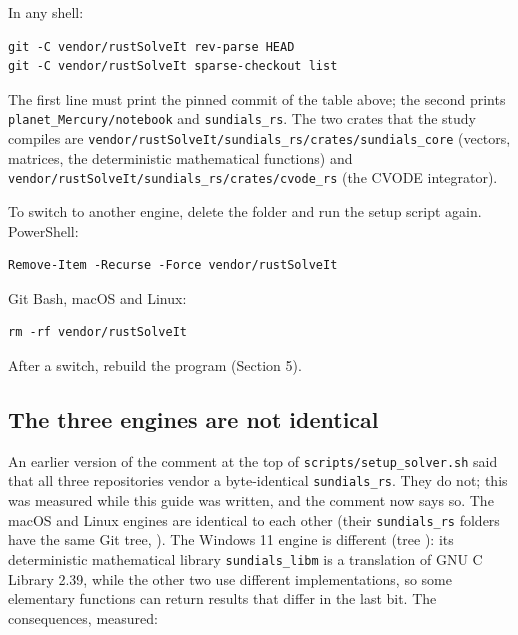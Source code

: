 \documentclass[11pt]{article}
\begin{document}
In any shell:

\begin{Verbatim}[fontsize=\small]
git -C vendor/rustSolveIt rev-parse HEAD
git -C vendor/rustSolveIt sparse-checkout list
\end{Verbatim}

The first line must print the pinned commit of the table above; the second prints \texttt{planet\_M\allowbreak{}ercury/n\allowbreak{}otebook} and \texttt{sundials\allowbreak{}\_rs}. The two crates that the study compiles are \texttt{vendor/r\allowbreak{}ustSolve\allowbreak{}It/sundi\allowbreak{}als\_rs/c\allowbreak{}rates/su\allowbreak{}ndials\_c\allowbreak{}ore} (vectors, matrices, the deterministic mathematical functions) and \texttt{vendor/r\allowbreak{}ustSolve\allowbreak{}It/sundi\allowbreak{}als\_rs/c\allowbreak{}rates/cv\allowbreak{}ode\_rs} (the CVODE integrator).

To switch to another engine, delete the folder and run the setup script again. PowerShell:

\begin{Verbatim}[fontsize=\small]
Remove-Item -Recurse -Force vendor/rustSolveIt
\end{Verbatim}

Git Bash, macOS and Linux:

\begin{Verbatim}[fontsize=\small]
rm -rf vendor/rustSolveIt
\end{Verbatim}

After a switch, rebuild the program (Section 5).

\subsection{The three engines are not identical}

An earlier version of the comment at the top of \texttt{scripts/\allowbreak{}setup\_so\allowbreak{}lver.sh} said that all three repositories vendor a byte-identical \texttt{sundials\allowbreak{}\_rs}. They do not; this was measured while this guide was written, and the comment now says so. The macOS and Linux engines are identical to each other (their \texttt{sundials\allowbreak{}\_rs} folders have the same Git tree, \texttt{}). The Windows 11 engine is different (tree \texttt{}): its deterministic mathematical library \texttt{sundials\allowbreak{}\_libm} is a translation of GNU C Library 2.39, while the other two use different implementations, so some elementary functions can return results that differ in the last bit. The consequences, measured:
\end{document}
